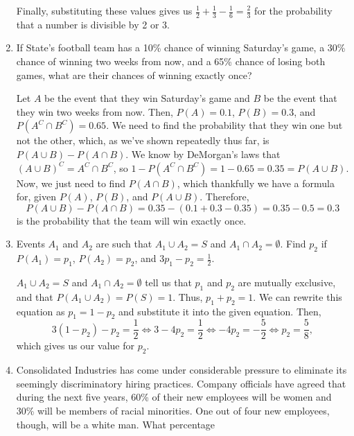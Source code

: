 \documentclass{article}
\begin{document}
\begin{enumerate}
\begin{solution}
        Finally, substituting these values gives us \(
            \frac{1}{2} + \frac{1}{3} - \frac{1}{6} = \frac{2}{3}
        \) for the probability that a number is divisible by 2 or 3. 
    \end{solution}
    \item If State's football team has a 10\% chance of winning Saturday's game, a 30\% chance of winning two weeks from now, and a 65\% chance of losing both games, what
    are their chances of winning exactly once?\begin{solution}
        Let \(A\) be the event that they win Saturday's game and \(B\) be the event that they win two weeks from now. Then, \(P(A) = 0.1\), \(P(B) = 0.3\), and \(P(A^C\cap{}B^C) = 0.65\).
        We need to find the probability that they win one but not the other, which, as we've shown repeatedly thus far, is \(P(A\cup{}B) - P(A\cap{}B)\). We know by DeMorgan's laws that 
        \({(A\cup{}B)}^C = A^C\cap{}B^C\), so \(1-P(A^C\cap{}B^C) = 1-0.65 = 0.35 = P(A\cup{}B)\). Now, we just need to find \(P(A\cap{}B)\), which thankfully we have a formula for, given 
        \(P(A)\), \(P(B)\), and \(P(A\cup{}B)\). Therefore,\[
            P(A\cup{}B) - P(A\cap{}B) = 0.35 - (0.1 + 0.3 - 0.35) = 0.35 - 0.5 = 0.3 
        \] is the probability that the team will win exactly once. 
    \end{solution}
    \item Events \(A_1\) and \(A_2\) are such that \(A_1 \cup{} A_2 = S\) and \(A_1 \cap A_2 = \emptyset\). Find \(p_2\) if \(P(A_1) = p_1\), \(P(A_2) = p_2\), and
    \(3p_1 - p_2 = \frac{1}{2}\).\begin{solution}
        \(A_1 \cup{} A_2 = S\) and \(A_1 \cap A_2 = \emptyset\) tell us that \(p_1\) and \(p_2\) are mutually exclusive, and that \(P(A_1\cup{}A_2) = P(S) = 1\). Thus, \(p_1 + p_2 = 1\). 
        We can rewrite this equation as \(p_1 = 1 - p_2\) and substitute it into the given equation. Then,\[
            3(1-p_2) - p_2 = \frac{1}{2} \Longleftrightarrow
            3 - 4p_2 = \frac{1}{2} \Longleftrightarrow
            -4p_2 = -\frac{5}{2} \Longleftrightarrow
            p_2 = \frac{5}{8},
        \] which gives us our value for \(p_2\). 
    \end{solution}
    \item Consolidated Industries has come under considerable pressure to eliminate its seemingly discriminatory hiring practices. Company officials have agreed that during
    the next five years, 60\% of their new employees will be women and 30\% will be members of racial minorities. One out of four new employees, though, will be a white man. What percentage

\end{enumerate}
\end{document}
